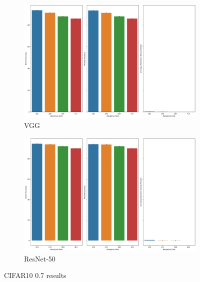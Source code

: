 \begin{figure}[h]
 \centering
     \begin{subfigure}[b]{\columnwidth}
    \includegraphics[width=1.1\columnwidth]{images/Supplementary_material/cifar10_vgg19_pruning_results_0.7.png}
    \caption{VGG}
    \label{subfig:vgg19CIfar10PR0.7}
     \end{subfigure}
      \hfill
     \begin{subfigure}[b]{\columnwidth}
    \includegraphics[width=1.1\columnwidth]{images/Supplementary_material/cifar10_resnet50_pruning_results_0.7.png}
    \caption{ResNet-50}
    \label{subfig:resenet50CIfar10PR0.7}
     \end{subfigure}
     \caption{ CIFAR10 0.7 results}
    \label{fig:pr_0.7_CIFAR10}
\end{figure}


